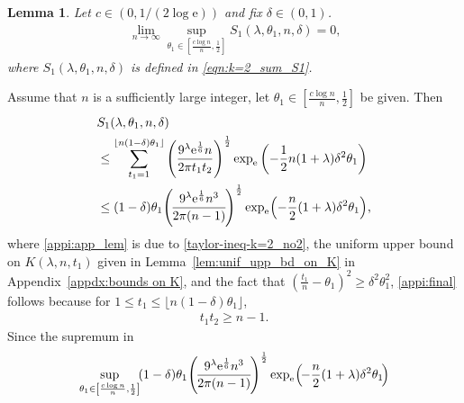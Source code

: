 \documentclass[journal, 10pt]{IEEEtran}
\newcommand{\rme}{\mathrm{e}}
\theoremstyle{plain}
\theoremstyle{plain}
\newtheorem{lem}{Lemma}%
\theoremstyle{plain}
\theoremstyle{plain}
\begin{document}
\begin{appendices}
\begin{lem}\label{lem:k=2_sum_S1_asympt}
Let $c\in (0, 1/(2\log \rme))$ and fix $\delta \in (0,1)$.
\begin{align}
\lim_{n \to \infty} \sup_{\theta_1\in \left[ \frac{c\log n}{n}, \frac{1}{2} \right]} S_1(\lambda, \theta_1, n, \delta)=0\text{,} \label{eqn:lem:achiv-k=2-S1}
\end{align}
where $S_1(\lambda, \theta_1, n, \delta)$ is defined in \eqref{eqn:k=2_sum_S1}.
\end{lem}
\begin{IEEEproof}
Assume that $n$ is a sufficiently large integer, let $\theta_1\in \left[ \frac{c\log n}{n}, \frac{1}{2} \right] $ be given. Then
\begin{align}
& S_1(\lambda, \theta_1, n, \delta) \nonumber \\
&\le 
\sum_{t_1=1}^{\lfloor n(1-\delta)\theta_1 \rfloor} \left(\frac{9^\lambda \rme^\frac16 n}{2\pi t_1t_2}\right)^\frac12 \exp_\rme\left(-\frac{1}{2}n(1+\lambda) {\delta^2 \theta_1}\right)\label{appi:app_lem}   \\
&\le 
 (1-\delta)\theta_1 \hspace{-0.5mm} \left(\hspace{-0.5mm}\frac{9^\lambda \rme^\frac16 n^3}{2\pi(n-1)}\hspace{-0.5mm}\right)^{\frac12} \exp_\rme\hspace{-0.5mm} \left(-\frac{n}{2}(1+\lambda)  {\delta^2 \theta_1}\right)\hspace{-0.5mm} \text{,} \label{appi:final}
\end{align}
where \eqref{appi:app_lem} is due to \eqref{taylor-ineq-k=2_no2}, the uniform upper bound on $K(\lambda, n, t_1)$ given in Lemma~\ref{lem:unif_upp_bd_on_K} in Appendix~\ref{appdx:bounds on K}, and the fact that $(\frac{t_1}{n}-\theta_1)^2\ge \delta^2 \theta_1^2$, \eqref{appi:final} follows because for $1\le t_1\le \lfloor n(1-\delta)\theta_1 \rfloor$, 
\begin{align}
t_1t_2 \ge n-1 \text{.}
\end{align}
Since the supremum in
\begin{align*}
\sup_{\theta_1\in \left[\frac{c\log n}{n}, \frac{1}{2} \right]} \hspace{-0.5mm}
(1-\delta)\theta_1 \hspace{-0.5mm} \left(\hspace{-0.5mm}\frac{9^\lambda \rme^\frac16 n^3}{2\pi(n-1)}\hspace{-0.5mm}\right)^{\frac12} \exp_\rme\hspace{-0.5mm} \left(\hspace{-0.5mm}-\frac{n}{2}(1+\lambda)  {\delta^2 \theta_1}\hspace{-0.5mm}\right)

\end{align*}
\end{IEEEproof}
\end{appendices}
\end{document}

